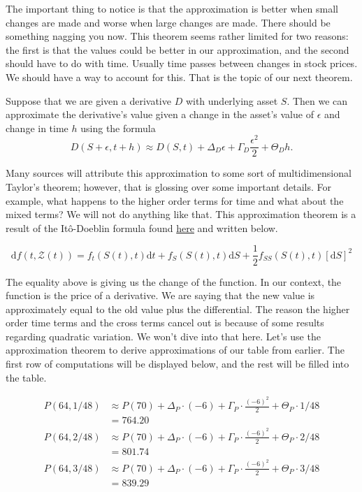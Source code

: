 \documentclass{ximera}
\begin{document}
The important thing to notice is that the approximation is better when small changes are made and worse when large changes are made. There should be something nagging you now. This theorem seems rather limited for two reasons: the first is that the values could be better in our approximation, and the second should have to do with time. Usually time passes between changes in stock prices. We should have a way to account for this. That is the topic of our next theorem.

\begin{theorem}
Suppose that we are given a derivative $D$ with underlying asset $S$. Then we can approximate the derivative's value given a change in the asset's value of $\epsilon$ and change in time $h$ using the formula
	\begin{equation*}
	D(S+\epsilon, t+h)\approx D(S, t)+\Delta_D\epsilon+\Gamma_D\frac{\epsilon^2}{2} +\Theta_Dh.
	\end{equation*}
\end{theorem}

Many sources will attribute this approximation to some sort of multidimensional Taylor's theorem; however, that is glossing over some important details. For example, what happens to the higher order terms for time and what about the mixed terms? We will not do anything like that. This approximation theorem is a result of the It\^{o}-Doeblin formula found \href{http://www.almoststochastic.com/2013/05/a-note-on-ito-doeblin-formula.html}{here} and written below.

\begin{equation*}
\mathrm{d}f(t, \mathcal{Z}(t))=f_t(S(t), t)\mathrm{d}t+f_S(S(t), t)\mathrm{d}S+\frac{1}{2}f_{SS}(S(t), t)[\mathrm{d}S]^2
\end{equation*}

The equality above is giving us the change of the function. In our context, the function is the price of a derivative. We are saying that the new value is approximately equal to the old value plus the differential. The reason the higher order time terms and the cross terms cancel out is because of some results regarding quadratic variation. We won't dive into that here. Let's use the approximation theorem to derive approximations of our table from earlier. The first row of computations will be displayed below, and the rest will be filled into the table.

\begin{align*}
P(64, 1/48) 	&\approx  P(70)+\Delta_P\cdot (-6)+\Gamma_P\cdot\frac{(-6)^2}{2}+\Theta_P\cdot 1/48\\
		&=764.20\\
P(64, 2/48) 	&\approx  P(70)+\Delta_P\cdot (-6)+\Gamma_P\cdot\frac{(-6)^2}{2}+\Theta_P\cdot 2/48\\
		&=801.74\\
P(64, 3/48) 	&\approx  P(70)+\Delta_P\cdot (-6)+\Gamma_P\cdot\frac{(-6)^2}{2}+\Theta_P\cdot 3/48\\
		&=839.29\\
\end{align*}
\end{document}
